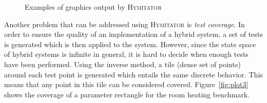 \documentclass{llncs}
\newcommand{\hymitator}{\textsc{Hymitator}}
\begin{document}
\begin{figure}[ht!]
	\centering
	\caption{Examples of graphics output by \hymitator{}}
	\label{fig:plot_rhb}
\end{figure}

Another problem that can be addressed using \hymitator{} is \emph{test   coverage}.
In order to ensure the quality of an implementation of a hybrid system, a set of tests is generated which is then applied to the system.
However, since the state space of hybrid systems is infinite in general, it is hard to decide when enough tests have been performed.
Using the inverse method, a tile (dense set of points) around each test point is generated which entails the same discrete behavior.
This means that any point in this tile can be considered covered.
Figure~\ref{fig:plot3} shows the coverage of a parameter rectangle for the room heating benchmark.
\end{document}
